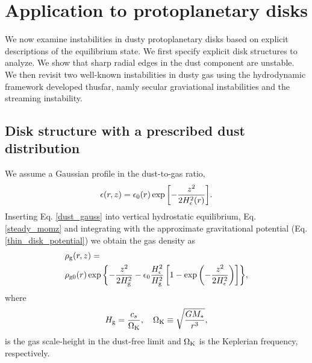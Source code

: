 



\section{Application to protoplanetary disks}\label{linear_problem}
We now examine instabilities in dusty protoplanetary disks
based on explicit descriptions of the equilibrium state. We first
specify explicit disk structures to analyze. We show 
that sharp radial edges in the dust component are unstable. We then
revisit two well-known instabilities in dusty gas using the
hydrodynamic framework developed thusfar, namly secular graviational
instabilities and the streaming instability. 

\subsection{Disk structure with a prescribed dust distribution}\label{steady_state}  
We assume a Gaussian profile in the
dust-to-gas ratio,    
\begin{align}\label{dust_gauss}
  \epsilon(r,z) = \epsilon_0(r)
  \exp{\left[-\frac{z^2}{2H_\epsilon^2(r)}\right]}. 
\end{align}
Inserting Eq. \ref{dust_gauss} into vertical hydrostatic equilibrium,
Eq. \ref{steady_momz} and integrating with the approximate
gravitational potential (Eq. \ref{thin_disk_potential}) we obtain the
gas density as
\begin{align}
  &\rho_\mathrm{g}(r,z)= \notag\\
&\rho_\mathrm{g0}(r)\exp{\left\{ - \frac{z^2}{2H_\mathrm{g}^2}
    -\epsilon_0\frac{H_\epsilon^2}{H_\mathrm{g}^2}\left[1 -
      \exp{\left(-\frac{z^2}{2H_\epsilon^2}\right)}\right] \right\}}, 
\end{align}
where
\begin{align}
  H_\mathrm{g} = \frac{c_s}{\Omega_{\rm K}}, \quad \Omega_{\rm K} \equiv \sqrt{\frac{GM_*}{r^3}},   
\end{align}
is the gas scale-height in the dust-free limit and $\Omega_{\rm K}$ is the
Keplerian frequency, respectively. 

